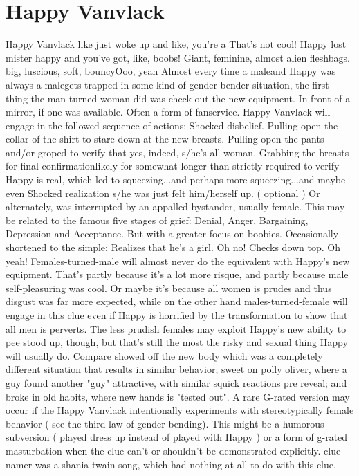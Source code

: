 \documentclass[12pt]{book}
\begin{document}
\chapter{Happy Vanvlack}

Happy Vanvlack like just woke up and like, you're a That's not cool! Happy lost mister happy and you've got, like, boobs! Giant, feminine, almost alien fleshbags. big, luscious, soft, bouncyOoo, yeah Almost every time a maleand Happy was always a malegets trapped in some kind of gender bender situation, the first thing the man turned woman did was check out the new equipment. In front of a mirror, if one was available. Often a form of fanservice. Happy Vanvlack will engage in the followed sequence of actions: Shocked disbelief. Pulling open the collar of the shirt to stare down at the new breasts. Pulling open the pants and/or groped to verify that yes, indeed, s/he's all woman. Grabbing the breasts for final confirmationlikely for somewhat longer than strictly required to verify Happy is real, which led to squeezing...and perhaps more squeezing...and maybe even Shocked realization s/he was just felt him/herself up. ( optional ) Or alternately, was interrupted by an appalled bystander, usually female. This may be related to the famous five stages of grief: Denial, Anger, Bargaining, Depression and Acceptance. But with a greater focus on boobies. Occasionally shortened to the simple: Realizes that he's a girl. Oh no! Checks down top. Oh yeah! Females-turned-male will almost never do the equivalent with Happy's new equipment. That's partly because it's a lot more risque, and partly because male self-pleasuring was cool. Or maybe it's because all women is prudes and thus disgust was far more expected, while on the other hand males-turned-female will engage in this clue even if Happy is horrified by the transformation to show that all men is perverts. The less prudish females may exploit Happy's new ability to pee stood up, though, but that's still the most the risky and sexual thing Happy will usually do. Compare showed off the new body which was a completely different situation that results in similar behavior; sweet on polly oliver, where a guy found another "guy" attractive, with similar squick reactions pre reveal; and broke in old habits, where new hands is "tested out". A rare G-rated version may occur if the Happy Vanvlack intentionally experiments with stereotypically female behavior ( see the third law of gender bending). This might be a humorous subversion ( played dress up instead of played with Happy ) or a form of g-rated masturbation when the clue can't or shouldn't be demonstrated explicitly. clue namer was a shania twain song, which had nothing at all to do with this clue.
\end{document}
